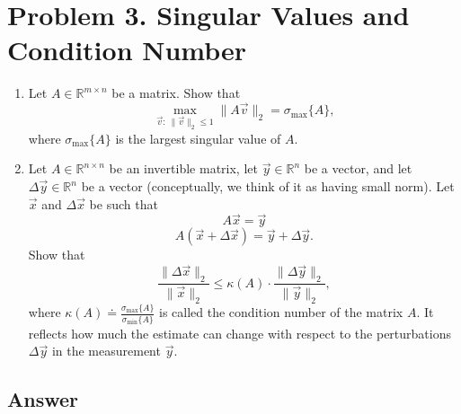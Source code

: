 \documentclass[
  12pt,
]{fphw}
\begin{document}
\section*{Problem 3. Singular Values and Condition Number}

\begin{enumerate}
\item[(a)] Let $A \in \mathbb{R}^{m\times n}$ be a matrix. Show that
\[
\max_{\vec v:\ \|\vec v\|_2\le 1} \|A\vec v\|_2 = \sigma_{\max}\{A\}, \tag{6}
\]
where $\sigma_{\max}\{A\}$ is the largest singular value of $A$.

\item[(b)] Let $A \in \mathbb{R}^{n\times n}$ be an invertible matrix, let $\vec y \in \mathbb{R}^n$ be a vector, and let $\Delta \vec y \in \mathbb{R}^n$ be a vector (conceptually,
we think of it as having small norm). Let $\vec x$ and $\Delta \vec x$ be such that
\[
A\vec x = \vec y \tag{7}
\]
\[
A(\vec x + \Delta \vec x) = \vec y + \Delta \vec y. \tag{8}
\]
Show that
\[
\frac{\|\Delta \vec x\|_2}{\|\vec x\|_2}
\le \kappa(A)\cdot \frac{\|\Delta \vec y\|_2}{\|\vec y\|_2}, \tag{9}
\]
where $\kappa(A) \doteq \frac{\sigma_{\max}\{A\}}{\sigma_{\min}\{A\}}$ is called the condition number of the matrix $A$. It reflects how much the estimate
can change with respect to the perturbations $\Delta \vec y$ in the measurement $\vec y$.
\end{enumerate}


\subsection*{Answer}
\end{document}
